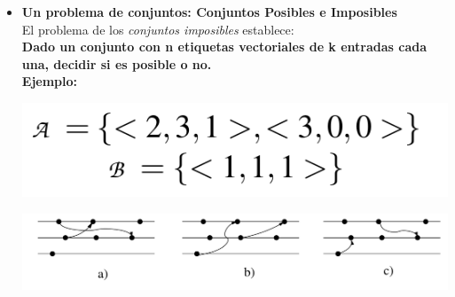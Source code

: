 \begin{itemize}
\item {\bf Un problema de conjuntos: Conjuntos Posibles e Imposibles}\\

El problema de los \textit{conjuntos imposibles} establece:\\
{\bf Dado un conjunto con n etiquetas vectoriales de k entradas cada una, 
decidir si es posible o no.}\\
{\bf Ejemplo:}
\begin{center}
    \includegraphics[scale=0.2]{Imagenes/Conjuntos.png}
    \end{center}
\begin{center}
    \includegraphics[scale=0.25]{Imagenes/Historia.png}
    \end{center}

\end{itemize}